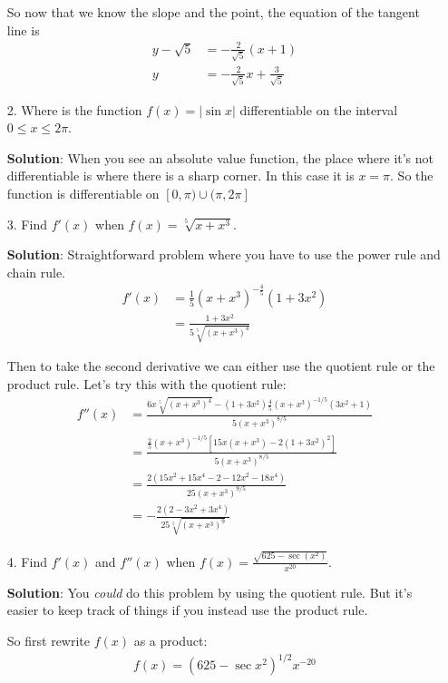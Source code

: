 \documentclass[11pt,reqno]{article}
\theoremstyle{definition}
\begin{document}
\begin{enumerate}
		So now that we know the slope and the point, the equation of the tangent line is 
		\begin{align*}
			y - \sqrt{5} &= -\frac{2}{\sqrt{5}}(x + 1) \\
			y &= -\frac{2}{\sqrt{5}} x + \frac{3}{\sqrt{5}}
		\end{align*}
		
		\newpage
		\item[2.] Where is the function $f(x) =  |\sin x |$ differentiable on the interval $0 \leq x \leq 2 \pi$. 
		
		\textbf{Solution}: When you see an absolute value function, the place where it's not differentiable is where there is a sharp corner. In this case it is $x = \pi$. So the function is differentiable on $[0, \pi) \cup (\pi,2\pi]$
		\item[3.] Find $f'(x)$ when $f(x) = \sqrt[5]{x + x^3}$. 
		
		\textbf{Solution}: Straightforward problem where you have to use the power rule and chain rule. 
		\begin{align*}
			f'(x) &= \frac{1}{5} (x + x^3)^{-\frac{4}{5}} (1 + 3x^2) \\
			&= \frac{1 + 3x^2}{5 \sqrt[5]{(x + x^3)^4}}
		\end{align*}
		
		Then to take the second derivative we can either use the quotient rule or the product rule. Let's try this with the quotient rule:
		\begin{align*}
			f''(x) &= \frac{6x \sqrt[5]{(x + x^3 )^4} - (1 + 3 x^2)\frac{4}{5} (x + x^3 )^{-1/5} (3 x^2 + 1) }{5 (x + x^3)^{8/5}} \\
				   &= \frac{\frac{2}{5} (x + x^3)^{-1/5} [15 x(x + x^3) - 2(1 + 3x^2 )^2]}{5 (x + x^3)^{8/5}} \\
				   &= \frac{2 (15x^2 + 15x^4 - 2 - 12x^2 - 18x^4)}{25 (x + x^3)^{9/5}} \\
				   &= -\frac{2(2 -3 x^2 +3 x^4 )}{25 \sqrt[5]{(x + x^{3})^9 }}
		\end{align*}
		\newpage
		
		\item[4.] Find $f'(x)$ and $f''(x)$ when $f(x) = \frac{\sqrt{625 - \sec (x^2)}}{ x^{20} }$.
		
		\textbf{Solution}: You \textit{could} do this problem by using the quotient rule. But it's easier to keep track of things if you instead use the product rule. 
		
		So first rewrite $f(x)$ as a product:
		\begin{align*}
			f(x) = (625 - \sec x^2)^{1/2} x^{-20}
		\end{align*}
		

\end{enumerate}
\end{document}
